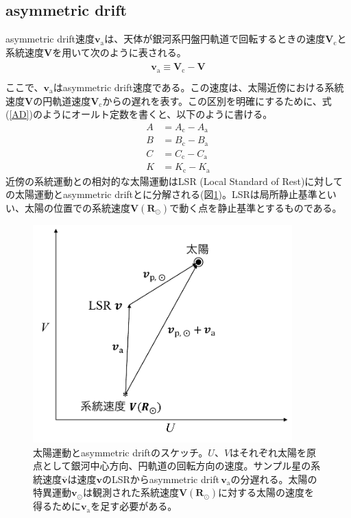 \subsection{asymmetric drift \label{sec_AD}} %
asymmetric drift速度$\pmb{v}_{\mathrm{a}}$は、天体が銀河系円盤円軌道で回転するときの速度$\pmb{V}_{\mathrm{c}}$と系統速度$\pmb{V}$を用いて次のように表される。
\begin{align}
\begin{aligned}
    \pmb{v}_{\mathrm{a}} \equiv \pmb{V}_{\mathrm{c}} - \pmb{V}\\
\end{aligned} \label{AD}
\end{align}
ここで、$\pmb{v}_{\mathrm{a}}$はasymmetric drift速度である。この速度は、太陽近傍における系統速度$\pmb{V}$の円軌道速度$\pmb{V}_{\mathrm{c}}$からの遅れを表す。この区別を明確にするために、式(\ref{AD})のようにオールト定数を書くと、以下のように書ける。
\begin{subequations}
\begin{align}
	A &= A_{\mathrm{c}} - A_{\mathrm{a}} \\
	B &= B_{\mathrm{c}} - B_{\mathrm{a}} \\
	C &= C_{\mathrm{c}} - C_{\mathrm{a}} \\
	K &= K_{\mathrm{c}} - K_{\mathrm{a}}
\end{align}
\end{subequations}
近傍の系統運動との相対的な太陽運動はLSR (Local Standard of Rest)に対しての太陽運動とasymmetric driftとに分解される(図\ref{fig1})。LSRは局所静止基準といい、太陽の位置での系統速度$\pmb{V}(\pmb{R}_{\odot})$で動く点を静止基準とするものである。

\begin{figure}[htbp]
\begin{center}
	\includegraphics[width=10cm]{fig/various_velocities.pdf}
	\caption{太陽運動とasymmetric driftのスケッチ。$U、V$はそれぞれ太陽を原点として銀河中心方向、円軌道の回転方向の速度。サンプル星の系統速度$\pmb{\overline{v}}$は速度$\pmb{v}$のLSRからasymmetric drift\,$\pmb{v}_{\mathrm{a}}$の分遅れる。太陽の特異運動$\pmb{v}_{\odot}$は観測された系統速度$\pmb{V}(\pmb{R}_{\odot})$に対する太陽の速度を得るために$\pmb{v}_{\mathrm{a}}$を足す必要がある。}
	\label{fig1}
\end{center}
\end{figure}

